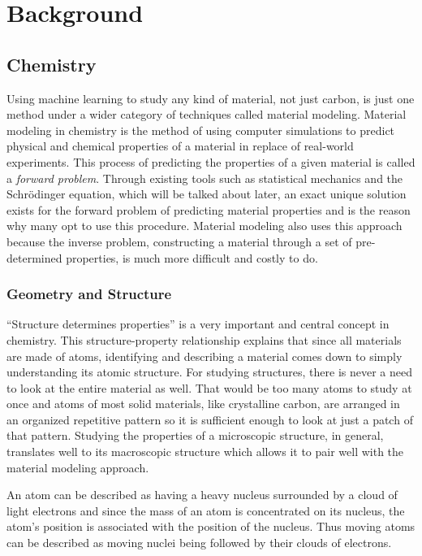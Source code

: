 \documentclass[12pt, abstract = true]{scrartcl}
\begin{document}
\section{Background}

\subsection{Chemistry}

Using machine learning to study any kind of material, not just carbon, 
is just one method under a wider category of techniques called material modeling. 
Material modeling in chemistry is the method of using computer simulations to predict 
physical and chemical properties of a material in replace of real-world experiments. 
This process of predicting the properties of a given material is called a \emph{forward 
problem}. Through existing tools such as statistical mechanics and the Schrödinger 
equation, which will be talked about later, an exact unique solution exists for the 
forward problem of predicting material properties and is the reason why many opt to 
use this procedure. Material modeling also uses this approach because the inverse 
problem, constructing a material through a set of pre-determined properties, 
is much more difficult and costly to do.

\subsubsection{Geometry and Structure}
``Structure determines properties'' is a very important and central concept in chemistry. 
This structure-property relationship explains that since all materials are made of atoms, identifying 
and describing a material comes down to simply understanding its atomic structure. For studying 
structures, there is never a need to look at the entire material as well. That would be too many 
atoms to study at once and atoms of most solid materials, like crystalline carbon, are arranged in 
an organized repetitive pattern so it is sufficient enough to look at just a patch of that pattern. 
Studying the properties of a microscopic structure, in general, translates well to its macroscopic 
structure which allows it to pair well with the material modeling approach.


An atom can be described as having a heavy nucleus surrounded by a cloud of light 
electrons and since the mass of an atom is concentrated on its nucleus, the atom's 
position is associated with the position of the nucleus. Thus moving atoms can be described
as moving nuclei being followed by their clouds of electrons. 
\end{document}
